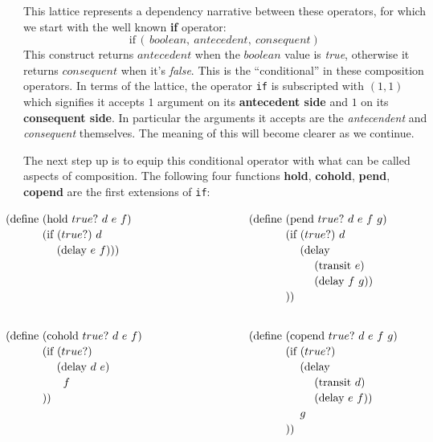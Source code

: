 \documentclass[twoside]{article}
\newcommand{\strong}[1]{{\bfseries #1}}
\newcommand{\tab}[1][1.125cm]{\hspace{#1}}
\newcommand{\col}[1][0ex]{& \hspace{#1}}
\newcommand{\delay}{\mbox{delay}}
\newcommand{\transit}{\mbox{transit}}
\newcommand{\define}{\mbox{define}}
\newcommand{\hold}{\mbox{hold}}
\newcommand{\cohold}{\mbox{cohold}}
\newcommand{\pend}{\mbox{pend}}
\newcommand{\copend}{\mbox{copend}}
\begin{document}

This lattice represents a dependency narrative between these operators,
for which we start with the well known \strong{if} operator:
$$ \mbox{if}\,(\,boolean,\ antecedent,\ consequent)\, $$
This construct returns $ antecedent $ when the $ boolean $ value is \emph{true}, otherwise it returns $ consequent $
when it's \emph{false}. This is the ``conditional'' in these composition operators. In terms of the lattice, the operator
\texttt{if} is subscripted with $ (1,1) $ which signifies it accepts $ 1 $ argument on its \strong{antecedent side} and $ 1 $
on its \strong{consequent side}. In particular the arguments it accepts are the \emph{antecendent} and \emph{consequent}
themselves. The meaning of this will become clearer as we continue.

The next step up is to equip this conditional operator with what can be called aspects of composition. The following four
functions \strong{hold}, \strong{cohold}, \strong{pend}, \strong{copend} are the first extensions of \texttt{if}:

$$ \def\arraystretch{1.15}
\tab[-1.5cm] \begin{array}{ll}

(\define\ (\hold\ true?\ d\ e\ f)		\col[3cm] (\define\ (\pend\ true?\ d\ e\ f\ g)			\\
\tab[1.15cm] (\mbox{if}\ (true?)\ d		\col[3cm] \tab[1.15cm] (\mbox{if}\ (true?)\ d			\\
\tab[1.60cm]  (\delay\ e\ f)))			\col[3cm] \tab[1.60cm]  (\delay					\\
						\col[3cm] \tab[2.05cm]  (\transit\ e)				\\
						\col[3cm] \tab[2.05cm]  (\delay\ f\ g))				\\
						\col[3cm] \tab[1.15cm] ))					\\[0.75cm]

(\define\ (\cohold\ true?\ d\ e\ f)		\col[3cm] (\define\ (\copend\ true?\ d\ e\ f\ g)		\\
\tab[1.15cm] (\mbox{if}\ (true?)		\col[3cm] \tab[1.15cm] (\mbox{if}\ (true?)			\\
\tab[1.60cm]  (\delay\ d\ e)			\col[3cm] \tab[1.60cm]  (\delay					\\
\tab[1.80cm]  f					\col[3cm] \tab[2.05cm]  (\transit\ d)				\\
\tab[1.15cm] ))					\col[3cm] \tab[2.05cm]  (\delay\ e\ f))				\\
						\col[3cm] \tab[1.60cm]  g					\\
						\col[3cm] \tab[1.15cm] ))					\\[0.25cm]
\end{array} $$
\end{document}
